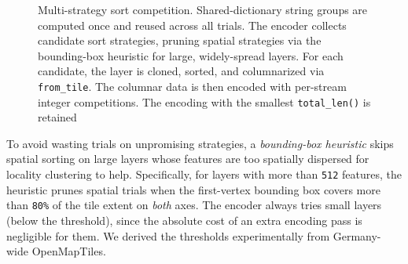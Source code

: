 {\begin{figure}[H]
    \caption{
Multi-strategy sort competition.
        Shared-dictionary string groups are computed once and reused across all trials.
        The encoder collects candidate sort strategies, pruning spatial strategies via the bounding-box heuristic for large, widely-spread layers.
        For each candidate, the layer is cloned, sorted, and columnarized via \texttt{from\_tile}.
The columnar data is then encoded with per-stream integer competitions.
        The encoding with the smallest \texttt{total\_len()} is retained}
    \label{fig:sort_competition}
\end{figure}

To avoid wasting trials on unpromising strategies, a \emph{bounding-box heuristic} skips spatial sorting on large layers whose features are too spatially dispersed for locality clustering to help.
Specifically, for layers with more than \texttt{512} features, the heuristic prunes spatial trials when the first-vertex bounding box covers more than \texttt{80\%} of the tile extent on \emph{both} axes.
The encoder always tries small layers (below the threshold), since the absolute cost of an extra encoding pass is negligible for them.
We derived the thresholds experimentally from Germany-wide OpenMapTiles.

}
